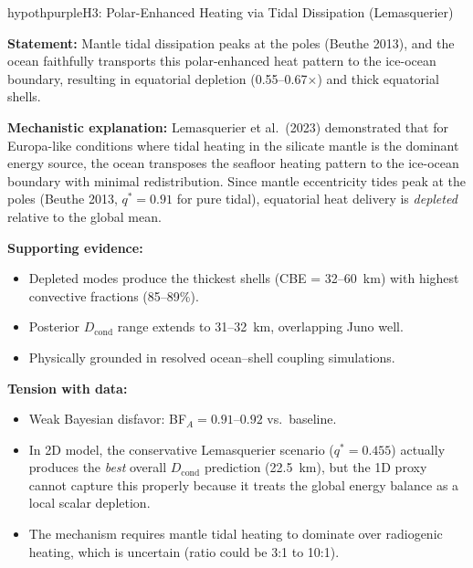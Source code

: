 \documentclass[11pt,letterpaper]{article}
\begin{document}
\newpage
\begin{hypothesisbox}{hypothpurple}{H3: Polar-Enhanced Heating via Tidal Dissipation (Lemasquerier)}

\textbf{Statement:} Mantle tidal dissipation peaks at the poles (Beuthe 2013), and the ocean faithfully transports this polar-enhanced heat pattern to the ice-ocean boundary, resulting in equatorial depletion (0.55--0.67$\times$) and thick equatorial shells.

\textbf{Mechanistic explanation:} Lemasquerier et al.\ (2023) demonstrated that for Europa-like conditions where tidal heating in the silicate mantle is the dominant energy source, the ocean transposes the seafloor heating pattern to the ice-ocean boundary with minimal redistribution. Since mantle eccentricity tides peak at the poles (Beuthe 2013, $q^* = 0.91$ for pure tidal), equatorial heat delivery is \textit{depleted} relative to the global mean.

\textbf{Supporting evidence:}
\begin{itemize}[nosep]
  \item Depleted modes produce the thickest shells (CBE = 32--60~km) with highest convective fractions (85--89\%).
  \item Posterior $D_\mathrm{cond}$ range extends to 31--32~km, overlapping Juno well.
  \item Physically grounded in resolved ocean--shell coupling simulations.
\end{itemize}

\textbf{Tension with data:}
\begin{itemize}[nosep]
  \item Weak Bayesian disfavor: BF$_A = 0.91$--$0.92$ vs.\ baseline.
  \item In 2D model, the conservative Lemasquerier scenario ($q^* = 0.455$) actually produces the \textit{best} overall $D_\mathrm{cond}$ prediction (22.5~km), but the 1D proxy cannot capture this properly because it treats the global energy balance as a local scalar depletion.
  \item The mechanism requires mantle tidal heating to dominate over radiogenic heating, which is uncertain (ratio could be 3:1 to 10:1).
\end{itemize}
\end{hypothesisbox}
\end{document}
